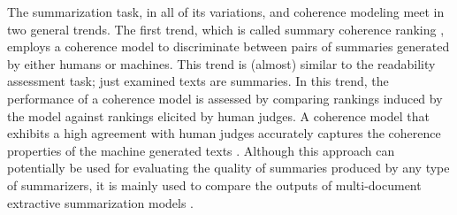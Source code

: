 The summarization task, in all of its variations, and coherence modeling meet in two general trends. 
The first trend, which is called summary coherence ranking \cite{barzilay08,guinaudeau13}, employs a coherence model to discriminate between pairs of summaries generated by either humans or machines. 
This trend is (almost) similar to the readability assessment task; just examined texts are summaries. 
In this trend, the performance of a coherence model is assessed by comparing rankings induced by the model against rankings elicited by human judges. 
A coherence model that exhibits a high agreement with human judges accurately captures the coherence properties of the machine generated texts \cite{barzilay08}. 
Although this approach can potentially be used for evaluating the quality of summaries produced by any type of summarizers, it is mainly used to compare the outputs of multi-document extractive summarization models \cite{barzilay08}. 

